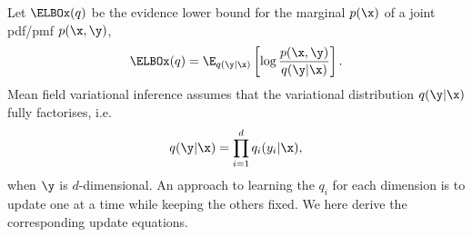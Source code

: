 
\label{ex:MFVI-I}
Let $\ELBOx(q)$ be the evidence lower bound for the marginal $p(\x)$ of a joint pdf/pmf $p(\x,\y)$,
\begin{equation}
  \ELBOx(q) = \E_{q(\y|\x)} \left[\log \frac{p(\x,\y)}{q(\y|\x)}\right].
  \end{equation}
Mean field variational inference assumes that the variational distribution $q(\y|\x)$ fully factorises, i.e.
\begin{equation}
  q(\y | \x) = \prod_{i=1}^d q_i(y_i | \x),
\end{equation}
when $\y$ is $d$-dimensional. An approach to learning the $q_i$ for
each dimension is to update one at a time while keeping the others fixed. We
here derive the corresponding update equations.

